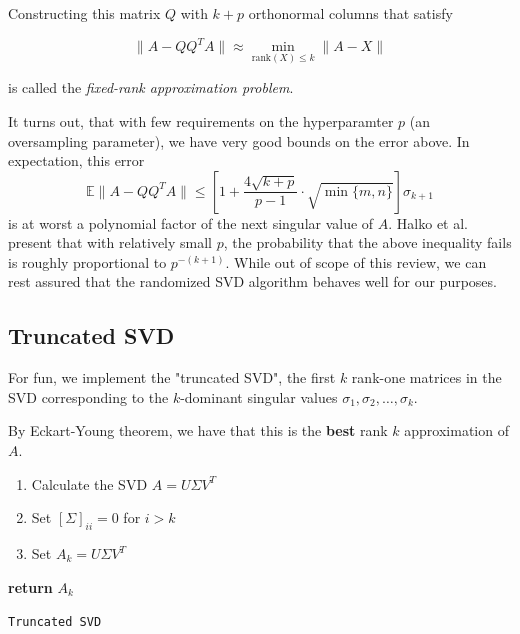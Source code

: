\documentclass{article}
\begin{document}
\bigskip

Constructing this matrix $Q$ with $k + p$ orthonormal columns that satisfy

\[\| A - QQ^T A\| \approx \min_{\text{rank}(X) \leq k} \| A - X \|\]

is called the \textit{fixed-rank approximation problem}.
\bigskip

It turns out, that with few requirements on the hyperparamter $p$ (an oversampling parameter), we have very good bounds on the error above.
In expectation, this error
\[\mathbb{E} \| A - QQ^TA\| \leq \left[ 1 + \frac{4\sqrt{k+p}}{p-1} \cdot \sqrt{\min\{m,n\}} \right] \sigma_{k+1}\]
is at worst a polynomial factor of the next singular value of $A$.
Halko et al. present that with relatively small $p$, the probability that the above inequality fails is roughly proportional to $p^{-(k+1)}$.
While out of scope of this review, we can rest assured that the randomized SVD algorithm behaves well for our purposes.

\subsection{Truncated SVD}

For fun, we implement the "truncated SVD", the first $k$ rank-one matrices in the SVD corresponding to the $k$-dominant singular values $\sigma_1, \sigma_2, \ldots, \sigma_k$.

\bigskip

By Eckart-Young theorem, we have that this is the \textbf{best} rank $k$ approximation of $A$.

\begin{center}
	\begin{minipage}{0.5\linewidth} %
		\begin{algorithm}[H]
			\medskip
			\begin{enumerate}
				\item Calculate the SVD $A = U \Sigma V^T$
				\item Set $[\Sigma]_{ii} = 0$ for $i > k$
				\item Set $A_k = U \Sigma V^T$
			\end{enumerate}
			
			{\bf return} $A_k$
			\caption{\texttt{Truncated SVD}} %
		\end{algorithm}
	\end{minipage}
\end{center}
\end{document}
